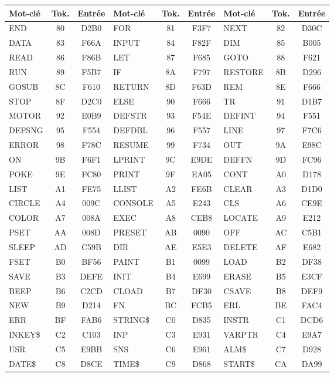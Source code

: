 \documentclass[a4paper,10pt]{article}
\begin{document}
{\small
\setlength{\tabcolsep}{4pt}
\begin{longtable}{@{}lcc|lcc|lcc@{}}
\toprule
Mot-clé & Tok. & Entrée & Mot-clé & Tok. & Entrée & Mot-clé & Tok. & Entrée \\
\midrule\endhead
\bottomrule\endfoot
END & 80 & D2B0 & FOR & 81 & F3F7 & NEXT & 82 & D30C \\
DATA & 83 & F66A & INPUT & 84 & F82F & DIM & 85 & B005 \\
READ & 86 & F86B & LET & 87 & F685 & GOTO & 88 & F621 \\
RUN & 89 & F5B7 & IF & 8A & F797 & RESTORE & 8B & D296 \\
GOSUB & 8C & F610 & RETURN & 8D & F63D & REM & 8E & F666 \\
STOP & 8F & D2C0 & ELSE & 90 & F666 & TR & 91 & D1B7 \\
MOTOR & 92 & E0B9 & DEFSTR & 93 & F54E & DEFINT & 94 & F551 \\
DEFSNG & 95 & F554 & DEFDBL & 96 & F557 & LINE & 97 & F7C6 \\
ERROR & 98 & F78C & RESUME & 99 & F734 & OUT & 9A & E98C \\
ON & 9B & F6F1 & LPRINT & 9C & E9DE & DEFFN & 9D & FC96 \\
POKE & 9E & FC80 & PRINT & 9F & EA05 & CONT & A0 & D178 \\
LIST & A1 & FE75 & LLIST & A2 & FE6B & CLEAR & A3 & D1D0 \\
CIRCLE & A4 & 009C & CONSOLE & A5 & E243 & CLS & A6 & CE9E \\
COLOR & A7 & 008A & EXEC & A8 & CEB8 & LOCATE & A9 & E212 \\
PSET & AA & 008D & PRESET & AB & 0090 & OFF & AC & C5B1 \\
SLEEP & AD & C59B & DIR & AE & E5E3 & DELETE & AF & E682 \\
FSET & B0 & BF56 & PAINT & B1 & 0099 & LOAD & B2 & DF38 \\
SAVE & B3 & DEFE & INIT & B4 & E699 & ERASE & B5 & E3CF \\
BEEP & B6 & C2CD & CLOAD & B7 & DF30 & CSAVE & B8 & DEF9 \\
NEW & B9 & D214 & FN & BC & FCB5 & ERL & BE & FAC4 \\
ERR & BF & FAB6 & STRING\$ & C0 & D835 & INSTR & C1 & DCD6 \\
INKEY\$ & C2 & C103 & INP & C3 & E931 & VARPTR & C4 & E9A7 \\
USR & C5 & E9BB & SNS & C6 & E961 & ALM\$ & C7 & D928 \\
DATE\$ & C8 & D8CE & TIME\$ & C9 & D868 & START\$ & CA & DA99 \\

\end{longtable}}
\end{document}
